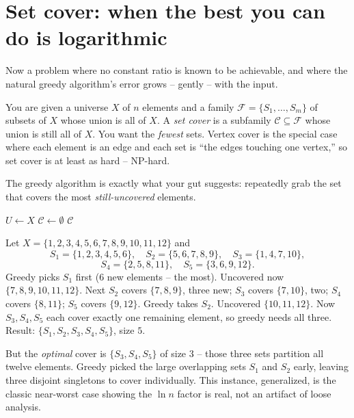\section{Set cover: when the best you can do is logarithmic}

Now a problem where no constant ratio is known to be achievable, and where
the natural greedy algorithm's error grows -- gently -- with the input.

You are given a universe $X$ of $n$ elements and a family
$\mathcal{F} = \{S_1,\dots,S_m\}$ of subsets of $X$ whose union is all of $X$.
A \emph{set cover} is a subfamily $\mathcal{C} \subseteq \mathcal{F}$ whose
union is still all of $X$. You want the \emph{fewest} sets. Vertex cover is
the special case where each element is an edge and each set is ``the edges
touching one vertex,'' so set cover is at least as hard -- NP-hard.

The greedy algorithm is exactly what your gut suggests: repeatedly grab the
set that covers the most \emph{still-uncovered} elements.

\begin{algorithm}[H]
\caption{\textsc{Greedy-Set-Cover}$(X,\mathcal{F})$}
$U \gets X$ 
$\mathcal{C} \gets \emptyset$\;
\Return $\mathcal{C}$\;
\end{algorithm}

\begin{example}
\label{ch34:sc-trace}
Let $X=\{1,2,3,4,5,6,7,8,9,10,11,12\}$ and
\[
S_1=\{1,2,3,4,5,6\},\quad S_2=\{5,6,7,8,9\},\quad S_3=\{1,4,7,10\},
\]
\[
S_4=\{2,5,8,11\},\quad S_5=\{3,6,9,12\}.
\]
Greedy picks $S_1$ first ($6$ new elements -- the most). Uncovered now
$\{7,8,9,10,11,12\}$. Next $S_2$ covers $\{7,8,9\}$, three new; $S_3$ covers
$\{7,10\}$, two; $S_4$ covers $\{8,11\}$; $S_5$ covers $\{9,12\}$. Greedy takes
$S_2$. Uncovered $\{10,11,12\}$. Now $S_3,S_4,S_5$ each cover exactly one
remaining element, so greedy needs all three. Result:
$\{S_1,S_2,S_3,S_4,S_5\}$, size $5$.

But the \emph{optimal} cover is $\{S_3,S_4,S_5\}$ of size $3$ -- those three
sets partition all twelve elements. Greedy picked the large overlapping sets $S_1$
and $S_2$ early, leaving three disjoint singletons to cover individually. This instance, generalized, is the classic
near-worst case showing the $\ln n$ factor is real, not an artifact of loose
analysis.
\end{example}

